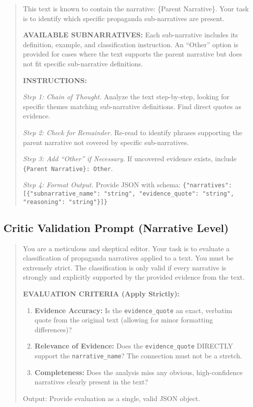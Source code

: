 \begin{small}
\begin{quote}
This text is known to contain the narrative: \{Parent Narrative\}. Your task is to identify which specific propaganda sub-narratives are present.

\textbf{AVAILABLE SUBNARRATIVES:} Each sub-narrative includes its definition, example, and classification instruction. An ``Other'' option is provided for cases where the text supports the parent narrative but does not fit specific sub-narrative definitions.

\textbf{INSTRUCTIONS:}

\textit{Step 1: Chain of Thought.} Analyze the text step-by-step, looking for specific themes matching sub-narrative definitions. Find direct quotes as evidence.

\textit{Step 2: Check for Remainder.} Re-read to identify phrases supporting the parent narrative not covered by specific sub-narratives.

\textit{Step 3: Add ``Other'' if Necessary.} If uncovered evidence exists, include \texttt{\{Parent Narrative\}: Other}.

\textit{Step 4: Format Output.} Provide JSON with schema: \texttt{\{"narratives": [\{"subnarrative\_name": "string", "evidence\_quote": "string", "reasoning": "string"\}]\}}
\end{quote}
\end{small}

\subsection{Critic Validation Prompt (Narrative Level)}

\begin{small}
\begin{quote}
You are a meticulous and skeptical editor. Your task is to evaluate a classification of propaganda narratives applied to a text. You must be extremely strict. The classification is only valid if every narrative is strongly and explicitly supported by the provided evidence from the text.

\textbf{EVALUATION CRITERIA (Apply Strictly):}
\begin{enumerate}
\item \textbf{Evidence Accuracy:} Is the \texttt{evidence\_quote} an exact, verbatim quote from the original text (allowing for minor formatting differences)?
\item \textbf{Relevance of Evidence:} Does the \texttt{evidence\_quote} DIRECTLY support the \texttt{narrative\_name}? The connection must not be a stretch.
\item \textbf{Completeness:} Does the analysis miss any obvious, high-confidence narratives clearly present in the text?
\end{enumerate}

Output: Provide evaluation as a single, valid JSON object.
\end{quote}
\end{small}

